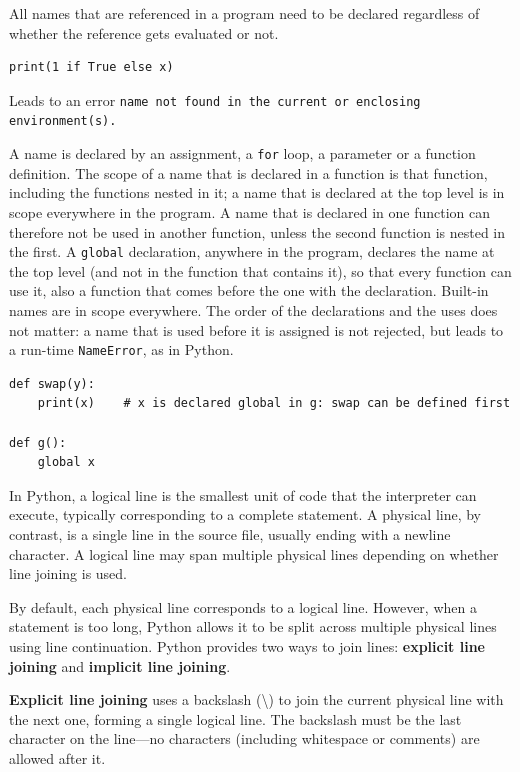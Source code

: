 \item All names that are referenced in a program need to be declared
  regardless of whether the reference gets evaluated or not.
\begin{lstlisting}
print(1 if True else x)
\end{lstlisting}
Leads to an error \texttt{name not found in the current or enclosing environment(s).}

A name is declared by an assignment, a \texttt{for} loop, a parameter or a function definition.
The scope of a name that is declared in a function is that function, including the functions
nested in it; a name that is declared at the top level is in scope everywhere in the program.
A name that is declared in one function can therefore not be used in another function, unless
the second function is nested in the first. A \texttt{global} declaration, anywhere in the
program, declares the name at the top level (and not in the function that contains it), so that
every function can use it, also a function that comes before the one with the declaration.
Built-in names are in scope everywhere. The order of the declarations and the uses does not
matter: a name that is used before it is assigned is not rejected, but leads to a run-time
\texttt{NameError}, as in Python.
\begin{lstlisting}
def swap(y):
    print(x)    # x is declared global in g: swap can be defined first

def g():
    global x
\end{lstlisting}

\item In Python, a logical line is the smallest unit of code that the 
interpreter can execute, typically corresponding to a complete statement. 
A physical line, by contrast, is a single line in the source file, 
usually ending with a newline character. A logical line may span multiple 
physical lines depending on whether line joining is used.

By default, each physical line corresponds to a logical line. However, 
when a statement is too long, Python allows it to be split across multiple 
physical lines using line continuation. Python provides two ways to join 
lines: \textbf{explicit line joining} and \textbf{implicit line joining}.

\textbf{Explicit line joining} uses a backslash (\textbackslash) to join 
the current physical line with the next one, forming a single logical line. 
The backslash must be the last character on the line—no characters 
(including whitespace or comments) are allowed after it.

